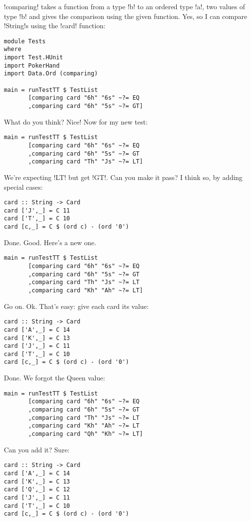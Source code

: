 \il!comparing! takes a function from a type \il!b! to an ordered type \il!a!, two values of type \il!b! and gives the comparison using the given function.
\lhN Yes, so I can compare \il!String!s using the \il!card! function:
\begin{lstlisting}[frame=single]
module Tests
where 
import Test.HUnit
import PokerHand
import Data.Ord (comparing)

main = runTestTT $ TestList 
       [comparing card "6h" "6s" ~?= EQ
       ,comparing card "6h" "5s" ~?= GT]
\end{lstlisting} %
\success What do you think?
\lhA \success Nice!
\lhN Now for my new test:
\begin{lstlisting}[frame=single]
main = runTestTT $ TestList 
       [comparing card "6h" "6s" ~?= EQ
       ,comparing card "6h" "5s" ~?= GT
       ,comparing card "Th" "Js" ~?= LT]
\end{lstlisting} %
\failure We're expecting \il!LT! but get \il!GT!. Can you make it pass?
\lhA
\failure I think so, by adding special cases:
\begin{lstlisting}[frame=single]
card :: String -> Card
card ['J',_] = C 11
card ['T',_] = C 10
card [c,_] = C $ (ord c) - (ord '0')
\end{lstlisting} %
\success Done.
\lhN Good. Here's a new one.
\begin{lstlisting}[frame=single]
main = runTestTT $ TestList 
       [comparing card "6h" "6s" ~?= EQ
       ,comparing card "6h" "5s" ~?= GT
       ,comparing card "Th" "Js" ~?= LT
       ,comparing card "Kh" "Ah" ~?= LT]
\end{lstlisting} %
\failure Go on.
\lhA \failure Ok. That's easy: give each card its value:
\begin{lstlisting}[frame=single]
card :: String -> Card
card ['A',_] = C 14
card ['K',_] = C 13
card ['J',_] = C 11
card ['T',_] = C 10
card [c,_] = C $ (ord c) - (ord '0')
\end{lstlisting} %
\success Done.
\lhN We forgot the Queen value:
\begin{lstlisting}[frame=single]
main = runTestTT $ TestList 
       [comparing card "6h" "6s" ~?= EQ
       ,comparing card "6h" "5s" ~?= GT
       ,comparing card "Th" "Js" ~?= LT
       ,comparing card "Kh" "Ah" ~?= LT
       ,comparing card "Qh" "Kh" ~?= LT]
\end{lstlisting} %
Can you add it?
\lhA \failure Sure:
\begin{lstlisting}[frame=single]
card :: String -> Card
card ['A',_] = C 14
card ['K',_] = C 13
card ['Q',_] = C 12
card ['J',_] = C 11
card ['T',_] = C 10
card [c,_] = C $ (ord c) - (ord '0')
\end{lstlisting} %
